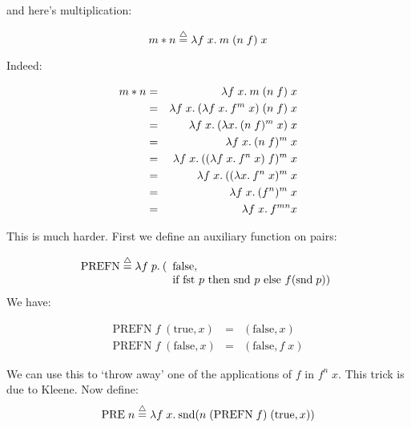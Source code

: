 \begin{slide*}


\vspace*{0.5cm}

and here's multiplication:

{\red $$ m * n \stackrel{\bigtriangleup}{=} \lambda f\; x.\: m\; (n\; f)\; x $$}

Indeed:

\begin{red}
\begin{eqnarray*}
 m * n  & = & \lambda f\; x.\: m\; (n\; f)\; x                              \\
        & = & \lambda f\; x.\: (\lambda f\; x.\: f^m\; x)\; (n\; f)\; x         \\
        & = & \lambda f\; x.\: (\lambda x.\: (n\; f)^m\; x)\; x                 \\
        & = & \lambda f\; x.\: (n\; f)^m\; x                                \\
        & = & \lambda f\; x.\: ((\lambda f\; x.\: f^n\; x)\; f)^m\; x           \\
        & = & \lambda f\; x.\: ((\lambda x.\: f^n\; x)^m\; x                    \\
        & = & \lambda f\; x.\: (f^n)^m\; x                                  \\
        & = & \lambda f\; x.\: f^{m n} x
\end{eqnarray*}
\end{red}

\end{slide*}


\begin{slide*}


\vspace*{0.5cm}

This is much harder. First we define an auxiliary function on pairs:

{\red $$ \mbox{PREFN} \stackrel{\bigtriangleup}{=}
   \lambda f\; p.\:
      (\begin{array}[t]{l} \mbox{false},\\
           \mbox{if fst } p \mbox{ then snd } p \mbox{ else } f(\mbox{snd}\; p)
       )\end{array}
  $$}
We have:
\begin{red}
\begin{eqnarray*}
\mbox{PREFN}\; f\; (\mbox{true},x)  & = & (\mbox{false},x)       \\
\mbox{PREFN}\; f\; (\mbox{false},x) & = & (\mbox{false},f\; x)
\end{eqnarray*}
\end{red}
We can use this to `throw away' one of the applications of {\red $f$} in
{\red $f^n\; x$}. This trick is due to Kleene. Now define:
{\red $$ \mbox{PRE}\; n \stackrel{\bigtriangleup}{=} \lambda f\; x.\:
   \mbox{snd} (n\; (\mbox{PREFN}\; f)\; (\mbox{true},x)) $$}

\end{slide*}



